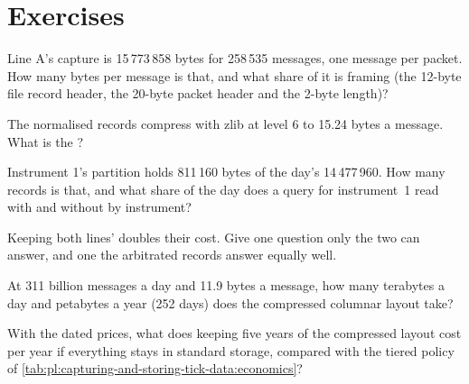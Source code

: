 \section{Exercises}

\begin{exercise}[$\star$]\label{exo:pl:capturing-and-storing-tick-data:1}
Line A's capture is 15\,773\,858 bytes for 258\,535 messages, one message per packet. How many bytes per message is that, and
what share of it is framing (the 12-byte file record header, the 20-byte packet header and the 2-byte length)?
\end{exercise}

\begin{exercise}[$\star$]\label{exo:pl:capturing-and-storing-tick-data:2}
The normalised records compress with zlib at level 6 to 15.24 bytes a message. What is the ?
\end{exercise}

\begin{exercise}[$\star$]\label{exo:pl:capturing-and-storing-tick-data:3}
Instrument 1's partition holds 811\,160 bytes of the day's 14\,477\,960. How many records is that, and what share of the day
does a query for instrument~1 read with and without  by instrument?
\end{exercise}

\begin{exercise}[$\star\star$]\label{exo:pl:capturing-and-storing-tick-data:4}
Keeping both lines'  doubles their cost. Give one question only the two  can answer, and one the
arbitrated records answer equally well.
\end{exercise}

\begin{exercise}[$\star\star$]\label{exo:pl:capturing-and-storing-tick-data:5}
At 311 billion messages a day and 11.9 bytes a message, how many terabytes a day and petabytes a year (252 days) does the
compressed columnar layout take?
\end{exercise}

\begin{exercise}[$\star\star$]\label{exo:pl:capturing-and-storing-tick-data:6}
With the dated prices, what does keeping five years of the compressed layout cost per year if everything stays in standard
storage, compared with the tiered policy of \cref{tab:pl:capturing-and-storing-tick-data:economics}?
\end{exercise}

